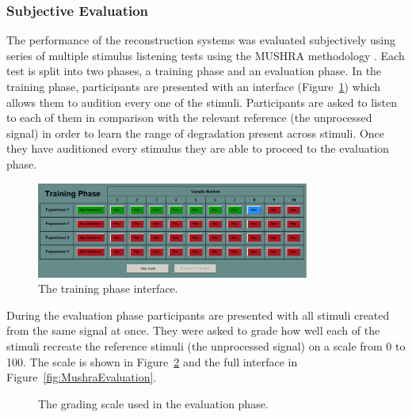 		\subsubsection*{Subjective Evaluation}
			The performance of the reconstruction systems was evaluated subjectively using series of multiple
			stimulus listening tests using the MUSHRA methodology \citep{mushra2014}. Each test is split into
			two phases, a training phase and an evaluation phase. In the training phase, participants are
			presented with an interface (Figure~\ref{fig:MushraTraining}) which allows them to audition every
			one of the stimuli. Participants are asked to listen to each of them in comparison with the
			relevant reference (the unprocessed signal) in order to learn the range of degradation present
			across stimuli. Once they have auditioned every stimulus they are able to proceed to the evaluation
			phase.

			\begin{figure}[h!]
				\centering
				\includegraphics[width=0.8\textwidth]{chapter7/Images/MushraTraining.png}
				\caption{The training phase interface.}
				\label{fig:MushraTraining}
			\end{figure}

			During the evaluation phase participants are presented with all stimuli created from the same
			signal at once. They were asked to grade how well each of the stimuli recreate the reference
			stimuli (the unprocessed signal) on a scale from 0 to 100. The scale is shown in
			Figure~\ref{fig:MushraScale} and the full interface in Figure~\ref{fig:MushraEvaluation}.

			\begin{figure}[h!]
				\centering
				\caption{The grading scale used in the evaluation phase.}
				\label{fig:MushraScale}
			\end{figure}

